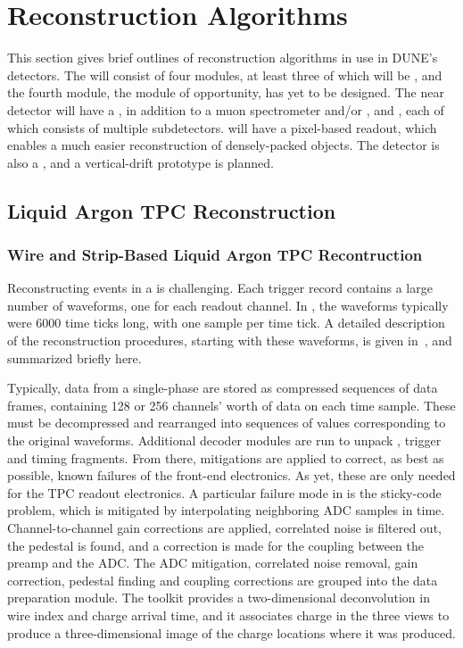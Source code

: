 \section{Reconstruction Algorithms}
\label{sec:algo:reco}

This section gives brief outlines of reconstruction algorithms in use in DUNE's detectors.  The  will consist of four modules, at least three of which will be , and the fourth module, the module of opportunity, has yet to be designed.  The near detector will have a , in addition to a muon spectrometer and/or , and , each of which consists of multiple subdetectors.   will have a pixel-based readout, which enables a much easier reconstruction of densely-packed objects.  The  detector is also a , and a vertical-drift prototype is planned.

\subsection{Liquid Argon TPC Reconstruction}
\label{sec:algo:reco:lartpc}

\subsubsection{Wire and Strip-Based Liquid Argon TPC Recontruction}
\label{sec:algo:reco:lartpc:wirestrip}

Reconstructing events in a  is challenging.  Each trigger record contains a large number of waveforms, one for each readout channel.  In , the waveforms typically were 6000 time ticks long, with one  sample per time tick.  A detailed description of the reconstruction procedures, starting with these waveforms, is given in~\cite{Abi:2020mwi}, and summarized briefly here.

Typically, data from a single-phase   are stored as compressed sequences of data frames, containing 128 or 256 channels' worth of data on each time sample.  These must be decompressed and rearranged into sequences of  values corresponding to the original waveforms.  Additional decoder modules are run to unpack ,  trigger and timing  fragments.
From there, mitigations are applied to correct, as best as possible, known failures of the front-end electronics.  As yet, these are only needed for the TPC readout electronics.  A particular failure mode in  is the sticky-code problem, which is mitigated by interpolating neighboring ADC samples in time.  Channel-to-channel gain corrections are applied, correlated noise is filtered out, the pedestal is found, and a correction is made for the  coupling between the preamp and the ADC.  The ADC mitigation, correlated noise removal, gain correction, pedestal finding and  coupling corrections are grouped into the data preparation module.  The  toolkit provides a two-dimensional deconvolution in wire index and charge arrival time, and it associates charge in the three views to produce a three-dimensional image of the charge locations where it was produced.  

